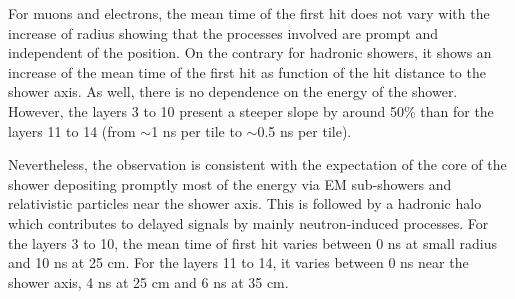 For muons and electrons, the mean time of the first hit does not vary with the increase of radius showing that the processes involved are prompt and independent of the position. On the contrary for hadronic showers, it shows an increase of the mean time of the first hit as function of the hit distance to the shower axis. As well, there is no dependence on the energy of the shower. However, the layers 3 to 10 present a steeper slope by around 50\% than for the layers 11 to 14 (from $\sim$1 ns per tile to $\sim$0.5 ns per tile).

Nevertheless, the observation is consistent with the expectation of the core of the shower depositing promptly most of the energy via EM sub-showers and relativistic particles near the shower axis. This is followed by a hadronic halo which contributes to delayed signals by mainly neutron-induced processes. For the layers 3 to 10, the mean time of first hit varies between 0 ns at small radius and 10 ns at 25 cm. For the layers 11 to 14, it varies between 0 ns near the shower axis, 4 ns at 25 cm and 6 ns at 35 cm.

